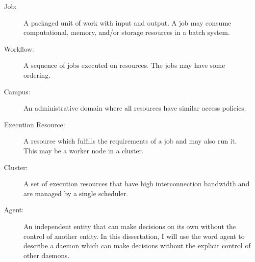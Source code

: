 \begin{description}
	\item[Job:] A packaged unit of work with input and output.  A job may consume computational, memory, and/or storage resources in a batch system.
	\item[Workflow:] A sequence of jobs executed on resources.  The jobs may have some ordering.
	\item[Campus:] An administrative domain where all resources have similar access policies.
	\item[Execution Resource:] A resource which fulfills the requirements of a job and may also run it.  This may be a worker node in a cluster.
	\item[Cluster:] A set of execution resources that have high interconnection bandwidth and are managed by a single scheduler.
	\item[Agent:] An independent entity that can make decisions on its own without the control of another entity.  In this dissertation, I will use the word agent to describe a daemon which can make decisions without the explicit control of other daemons.
\end{description}



